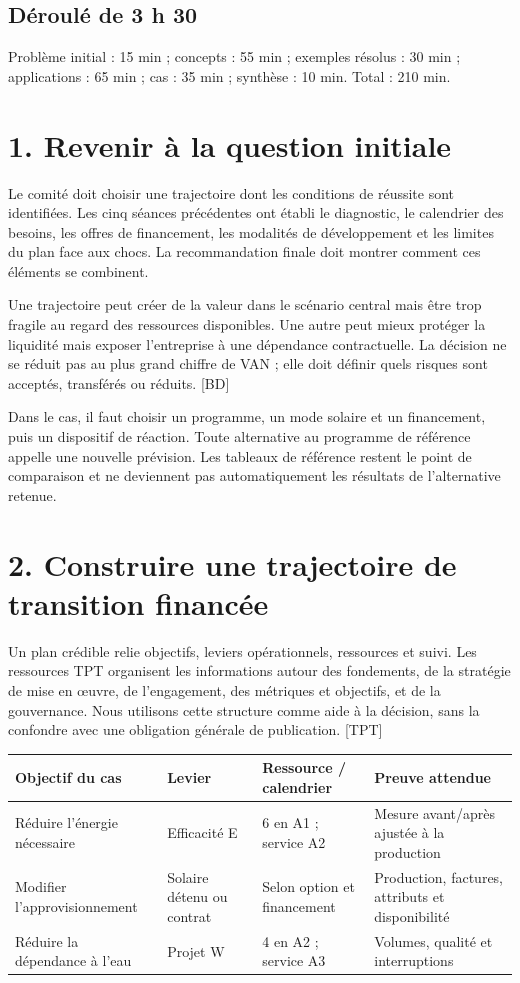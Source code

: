 \documentclass[12pt,a4paper]{article}
\begin{document}
\subsection*{Déroulé de 3 h 30}
Problème initial : 15 min ; concepts : 55 min ; exemples résolus : 30 min ; applications : 65 min ; cas : 35 min ; synthèse : 10 min. Total : 210 min.

\section*{1. Revenir à la question initiale}
Le comité doit choisir une trajectoire dont les conditions de réussite sont identifiées. Les cinq séances précédentes ont établi le diagnostic, le calendrier des besoins, les offres de financement, les modalités de développement et les limites du plan face aux chocs. La recommandation finale doit montrer comment ces éléments se combinent.


Une trajectoire peut créer de la valeur dans le scénario central mais être trop fragile au regard des ressources disponibles. Une autre peut mieux protéger la liquidité mais exposer l’entreprise à une dépendance contractuelle. La décision ne se réduit pas au plus grand chiffre de VAN ; elle doit définir quels risques sont acceptés, transférés ou réduits. [BD]


Dans le cas, il faut choisir un programme, un mode solaire et un financement, puis un dispositif de réaction. Toute alternative au programme de référence appelle une nouvelle prévision. Les tableaux de référence restent le point de comparaison et ne deviennent pas automatiquement les résultats de l’alternative retenue.

\section*{2. Construire une trajectoire de transition financée}
Un plan crédible relie objectifs, leviers opérationnels, ressources et suivi. Les ressources TPT organisent les informations autour des fondements, de la stratégie de mise en œuvre, de l’engagement, des métriques et objectifs, et de la gouvernance. Nous utilisons cette structure comme aide à la décision, sans la confondre avec une obligation générale de publication. [TPT]



\Needspace{180pt}
\begin{longtable}{p{3.67cm}p{3.67cm}p{3.67cm}p{3.67cm}}
\toprule
Objectif du cas & Levier & Ressource / calendrier & Preuve attendue \\
\midrule\endhead
Réduire l’énergie nécessaire & Efficacité E & 6 en A1 ; service A2 & Mesure avant/après ajustée à la production \\
Modifier l’approvisionnement & Solaire détenu ou contrat & Selon option et financement & Production, factures, attributs et disponibilité \\
Réduire la dépendance à l’eau & Projet W & 4 en A2 ; service A3 & Volumes, qualité et interruptions \\
\bottomrule
\end{longtable}
\end{document}
